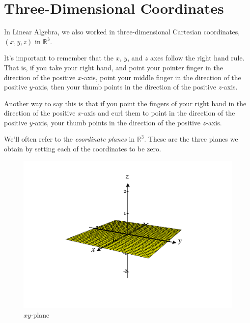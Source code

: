 \documentclass{ximera}
\begin{document}
\section*{Three-Dimensional Coordinates}

In Linear Algebra, we also worked in three-dimensional Cartesian coordinates, $(x,y,z)$ in $\mathbb{R}^3$.

\begin{image}
\end{image}

It's important to remember that the $x$, $y$, and $z$ axes follow the right hand rule. That is, if you take your right hand, and point your pointer finger in the direction of the positive $x$-axis, point your middle finger in the direction of the positive $y$-axis, then your thumb points in the direction of the positive $z$-axis.

Another way to say this is that if you point the fingers of your right hand in the direction of the positive $x$-axis and curl them to point in the direction of the positive $y$-axis, your thumb points in the direction of the positive $z$-axis.


We'll often refer to the \emph{coordinate planes} in $\mathbb{R}^3$. These are the three planes we obtain by setting each of the coordinates to be zero.

\begin{figure}[h!]
\caption{$xy$-plane}
\includegraphics[width=\textwidth]{CalcPlot3D-xy_plane}
\end{figure}
\end{document}
